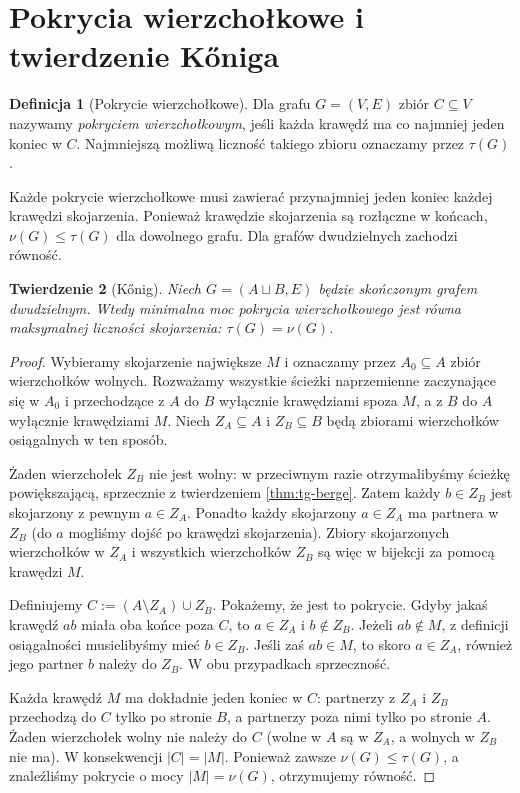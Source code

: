 \documentclass[11pt,a4paper]{report}
\numberwithin{equation}{section}
\theoremstyle{plain}
\newtheorem{twierdzenie}{Twierdzenie}[section]
\theoremstyle{definition}
\newtheorem{definicja}[twierdzenie]{Definicja}
\theoremstyle{remark}
\begin{document}
\section{Pokrycia wierzchołkowe i twierdzenie Kőniga}
\label{sec:tg-konig}

\begin{definicja}[Pokrycie wierzchołkowe]
Dla grafu $G=(V,E)$ zbiór $C\subseteq V$ nazywamy
\emph{pokryciem wierzchołkowym}, jeśli każda krawędź
ma co najmniej jeden koniec w $C$.
Najmniejszą możliwą liczność takiego zbioru
oznaczamy przez $\tau(G)$.
\end{definicja}

Każde pokrycie wierzchołkowe musi zawierać przynajmniej
jeden koniec każdej krawędzi skojarzenia. Ponieważ
krawędzie skojarzenia są rozłączne w końcach,
$\nu(G)\le\tau(G)$ dla dowolnego grafu. Dla grafów
dwudzielnych zachodzi równość.

\begin{twierdzenie}[Kőnig]
\label{thm:tg-konig}
Niech $G=(A\sqcup B,E)$ będzie skończonym grafem
dwudzielnym. Wtedy minimalna moc pokrycia
wierzchołkowego jest równa maksymalnej liczności
skojarzenia: $\tau(G)=\nu(G)$.
\end{twierdzenie}

\begin{proof}
Wybieramy skojarzenie największe $M$ i oznaczamy
przez $A_0\subseteq A$ zbiór wierzchołków wolnych.
Rozważamy wszystkie ścieżki naprzemienne zaczynające
się w $A_0$ i przechodzące z $A$ do $B$ wyłącznie
krawędziami spoza $M$, a z $B$ do $A$ wyłącznie
krawędziami $M$. Niech $Z_A\subseteq A$ i $Z_B\subseteq B$
będą zbiorami wierzchołków osiągalnych w ten sposób.

Żaden wierzchołek $Z_B$ nie jest wolny: w przeciwnym
razie otrzymalibyśmy ścieżkę powiększającą,
sprzecznie z twierdzeniem \ref{thm:tg-berge}.
Zatem każdy $b\in Z_B$ jest skojarzony z pewnym
$a\in Z_A$. Ponadto każdy skojarzony $a\in Z_A$
ma partnera w $Z_B$ (do $a$ mogliśmy dojść
po krawędzi skojarzenia). Zbiory skojarzonych
wierzchołków w $Z_A$ i wszystkich wierzchołków
$Z_B$ są więc w bijekcji za pomocą krawędzi $M$.

Definiujemy $C:=(A\setminus Z_A)\cup Z_B$.
Pokażemy, że jest to pokrycie. Gdyby jakaś
krawędź $ab$ miała oba końce poza $C$,
to $a\in Z_A$ i $b\notin Z_B$.
Jeżeli $ab\notin M$, z definicji osiągalności
musielibyśmy mieć $b\in Z_B$. Jeśli zaś $ab\in M$,
to skoro $a\in Z_A$, również jego partner $b$
należy do $Z_B$. W obu przypadkach sprzeczność.

Każda krawędź $M$ ma dokładnie jeden koniec w $C$:
partnerzy z $Z_A$ i $Z_B$ przechodzą do $C$ tylko
po stronie $B$, a partnerzy poza nimi tylko po
stronie $A$. Żaden wierzchołek wolny nie należy
do $C$ (wolne w $A$ są w $Z_A$, a wolnych
w $Z_B$ nie ma). W konsekwencji $|C|=|M|$.
Ponieważ zawsze $\nu(G)\le\tau(G)$, a znaleźliśmy
pokrycie o mocy $|M|=\nu(G)$, otrzymujemy równość.
\end{proof}
\end{document}
